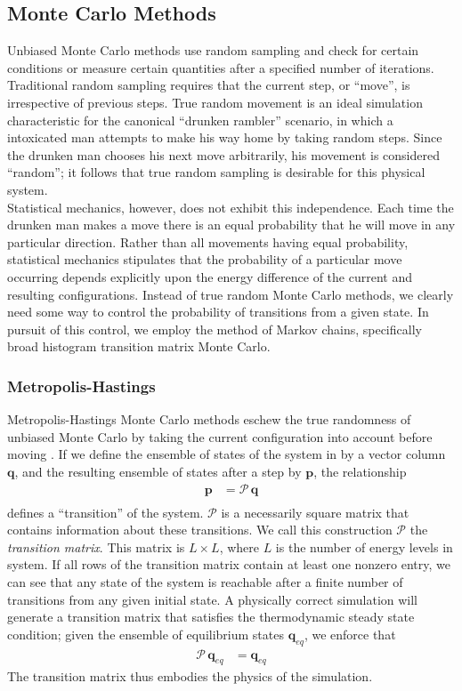\documentclass[12pt]{article}
\begin{document}
\subsection{Monte Carlo Methods}

Unbiased Monte Carlo methods use random sampling and check for certain conditions or measure certain quantities after a specified number of iterations. Traditional random sampling requires that the current step, or ``move'', is irrespective of previous steps. True random movement is an ideal simulation characteristic for the canonical ``drunken rambler'' scenario, in which a intoxicated man attempts to make his way home by taking random steps. Since the drunken man chooses his next move arbitrarily, his movement is considered ``random''; it follows that true random sampling is desirable for this physical system. \\

Statistical mechanics, however, does not exhibit this independence. Each time the drunken man makes a move there is an equal probability that he will move in any particular direction. Rather than all movements having equal probability, statistical mechanics stipulates that the probability of a particular move occurring depends explicitly upon the energy difference of the current and resulting configurations. Instead of true random Monte Carlo methods, we clearly need some way to control the probability of transitions from a given state. In pursuit of this control, we employ the method of Markov chains, specifically broad histogram transition matrix Monte Carlo.
\subsubsection{Metropolis-Hastings}
Metropolis-Hastings Monte Carlo methods eschew the true randomness of unbiased Monte Carlo by taking the current configuration into account before moving \cite{metro-hastings}. If we define the ensemble of states of the system in by a vector column $\mathbf{q}$, and the resulting ensemble of states after a step by $\mathbf{p}$, the relationship
\begin{align*}
    \mathbf{p} &= \mathcal{P}\, \mathbf{q}\\
\end{align*}
defines a ``transition'' of the system. $\mathcal{P}$ is a necessarily square matrix that contains information about these transitions. We call this construction $\mathcal{P}$ the {\it transition matrix}. This matrix is $L\times L$, where $L$ is the number of energy levels in system. If all rows of the transition matrix contain at least one nonzero entry, we can see that any state of the system is reachable after a finite number of transitions from any given initial state. A physically correct simulation will generate a transition matrix that satisfies the thermodynamic steady state condition; given the ensemble of equilibrium states $\mathbf{q}_{eq}$, we enforce that
\begin{align}
    \mathcal{P}\,\mathbf{q}_{eq} &= \mathbf{q}_{eq}
    \label{thermo-steady-state}
\end{align}
The transition matrix thus embodies the physics of the simulation.
\end{document}
